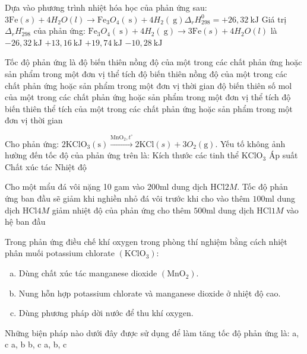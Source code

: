 \begin{ex}
	Dựa vào phương trình nhiệt hóa học của phản ứng sau:
	$3\mathrm{Fe}(s)+4H_2O(l) \to \mathrm{Fe}_3O_4(\mathrm{~s})+4H_2(\mathrm{~g}) \Delta_r H_{298}^0=+26,32\mathrm{~kJ}$
	Giá trị $\Delta_r H_{298}^{\circ}$ của phản ứng: $\mathrm{Fe}_3O_4(\mathrm{~s})+4H_2(\mathrm{~g}) \to 3\mathrm{Fe}(s)+4H_2O(l)$ là
	\choice
	{$-26,32\mathrm{~kJ}$}
	{$+13,16\mathrm{~kJ}$}
	{$+19,74\mathrm{~kJ}$}
	{$-10,28\mathrm{~kJ}$}
	\loigiai{}
\end{ex}
\begin{ex}
	Tốc độ phản ứng là
	\choice
	{độ biến thiên nồng độ của một trong các chất phản ứng hoặc sản phẩm trong một đơn vị thể tích}
	{độ biến thiên nồng độ của một trong các chất phản ứng hoặc sản phẩm trong một đơn vị thời gian}
	{độ biến thiên số mol của một trong các chất phản ứng hoặc sản phẩm trong một đơn vị thể tích}
	{độ biến thiên thể tích của một trong các chất phản ứng hoặc sản phẩm trong một đơn vị thời gian}
	\loigiai{}
\end{ex}
\begin{ex}
	Cho phản ứng: $2\mathrm{KClO}_3(\mathrm{s}) \xrightarrow{\mathrm{MnO}_2, t^{\circ}} 2\mathrm{KCl}(s)+3O_2(\mathrm{g})$. Yếu tố không ảnh hường đến tốc độ của phản ứng trên là:
	\choice
	{Kích thước các tinh thể $\mathrm{KClO}_3$}
	{Áp suất}
	{Chất xúc tác}
	{Nhiệt độ}
	\loigiai{}
\end{ex}
\begin{ex}
	Cho một mẩu đá vôi nặng 10 gam vào $200\mathrm{ml}$ dung dịch $\mathrm{HCl} 2M$. Tốc độ phản ứng ban đầu sẽ giảm khi
	\choice
	{nghiền nhỏ đá vôi trước khi cho vào}
	{thêm $100\mathrm{ml}$ dung dịch $\mathrm{HCl} 4M$}
	{giảm nhiệt độ của phản ứng}
	{cho thêm $500\mathrm{ml}$ dung dịch $\mathrm{HCl} 1M$ vào hệ ban đầu}
	\loigiai{}
\end{ex}
\begin{ex}
	Trong phản ứng điều chế khí oxygen trong phòng thí nghiệm bằng cách nhiệt phân muối potassium chlorate $\left(\mathrm{KClO}_3\right)$:
	\begin{enumerate}[(a)]
	\item Dùng chất xúc tác manganese dioxide $\left(\mathrm{MnO}_2\right)$.
	\item Nung hỗn hợp potassium chlorate và manganese dioxide ở nhiệt độ cao.
	\item Dùng phương pháp dời nước để thu khí oxygen.
	\end{enumerate}
	Những biện pháp nào dưới đây được sử dụng để làm tăng tốc độ phản ứng là:
	\choice
	{a, c}
	{a, b}
	{b, c}
	{a, b, c}
	\loigiai{}
\end{ex}
